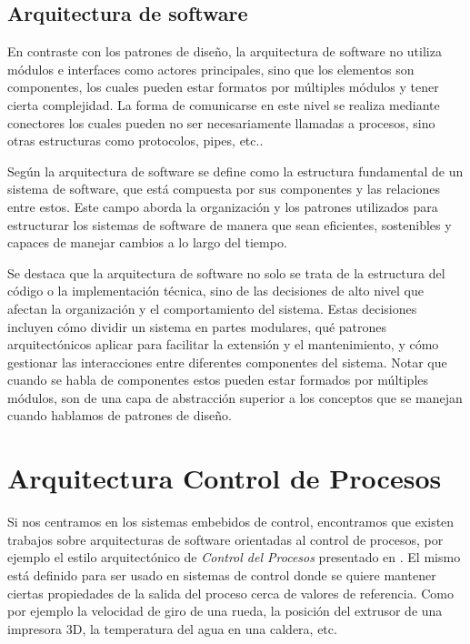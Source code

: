 \subsection{Arquitectura de software}
\label{secArq}

En contraste con los patrones de diseño, la arquitectura de software no utiliza módulos e interfaces como actores principales, sino que los elementos son componentes, los cuales pueden estar formatos por múltiples módulos y tener cierta complejidad. La forma de comunicarse en este nivel se realiza mediante conectores los cuales pueden no ser necesariamente llamadas a procesos, sino otras estructuras como protocolos, pipes, etc..

Según \cite{ShawGarlan1996} la arquitectura de software se define como la estructura fundamental de un sistema de software, que está compuesta por sus componentes y las relaciones entre estos. Este campo aborda la organización y los patrones utilizados para estructurar los sistemas de software de manera que sean eficientes, sostenibles y capaces de manejar cambios a lo largo del tiempo.

Se destaca que la arquitectura de software no solo se trata de la estructura del código o la implementación técnica, sino de las decisiones de alto nivel que afectan la organización y el comportamiento del sistema. Estas decisiones incluyen cómo dividir un sistema en partes modulares, qué patrones arquitectónicos aplicar para facilitar la extensión y el mantenimiento, y cómo gestionar las interacciones entre diferentes componentes del sistema. Notar que cuando se habla de componentes estos pueden estar formados por múltiples módulos, son de una capa de abstracción superior a los conceptos que se manejan cuando hablamos de patrones de diseño.


\section{Arquitectura Control de Procesos}

Si nos centramos en los sistemas embebidos de control, encontramos que existen trabajos sobre arquitecturas de software orientadas al control de procesos, por ejemplo el estilo arquitectónico de \textit{Control del Procesos} presentado en \cite{ShawGarlan1996}. El mismo está definido para ser usado en sistemas de control donde se quiere mantener ciertas propiedades de la salida del proceso cerca de valores de referencia. Como por ejemplo la velocidad de giro de una rueda, la posición del extrusor de una impresora 3D, la temperatura del agua en una caldera, etc.


